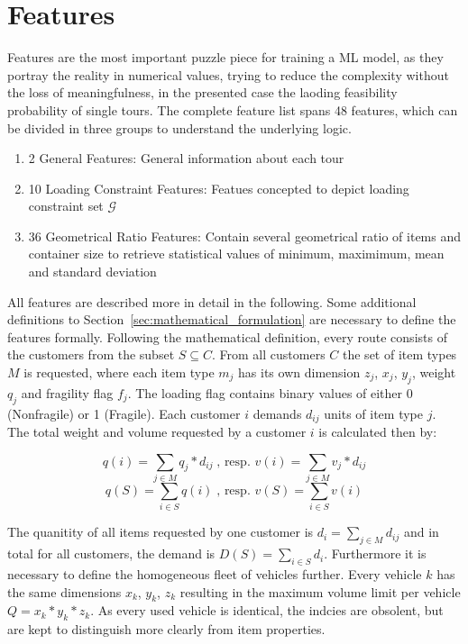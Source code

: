 \section{Features}
\label{sec:Features}

Features are the most important puzzle piece for training a \gls{ML} model, as they portray the reality in numerical values, trying to
reduce the complexity without the loss of meaningfulness, in the presented case the laoding feasibility probability of single tours.
The complete feature list spans 48 features, which can be divided in three groups to understand the underlying logic.

\begin{enumerate}
    \item 2 General Features: General information about each tour
    \item 10 Loading Constraint Features: Featues concepted to depict loading constraint set $\mathcal{G}$
    \item 36 Geometrical Ratio Features: Contain several geometrical ratio of items and container size to retrieve
          statistical values of minimum, maximimum, mean and standard deviation
\end{enumerate}

All features are described more in detail in the following. Some additional definitions to Section~\ref{sec:mathematical_formulation}
are necessary to define the features formally. Following the mathematical definition, every route consists of the customers
from the subset $S \subseteq C$. From all customers $C$ the set of item types $M$ is requested, where each item type $m_j$ has its own
dimension {$z_j$, $x_j$, $y_j$}, weight $q_j$ and fragility flag $f_j$. The loading flag contains binary values of either 0 (Nonfragile)
or 1 (Fragile). Each customer $i$ demands $d_{ij}$ units of item type $j$.
The total weight and volume requested by a customer $i$ is calculated then by:

\[q(i) = \sum_{j \in M} q_j * d_{ij}\;\text{, resp. } v(i) = \sum_{j \in M} v_j * d_{ij}\]
\[q(S) = \sum_{i\in S} q(i)\;\text{, resp. } v(S) = \sum_{i\in S} v(i)\]

The quanitity of all items requested by one customer is $d_i = \sum_{j \in M} d_{ij}$ and in total for all customers,
the demand is $D(S) = \sum_{i\in S} d_i$. Furthermore it is necessary to define the homogeneous fleet of vehicles
further. Every vehicle $k$ has the same dimensions {$x_k$, $y_k$, $z_k$} resulting in the maximum volume limit per
vehicle $Q = x_k *y_k*z_k$. As every used vehicle is identical, the indcies are obsolent, but are kept to distinguish more clearly
from item properties.

